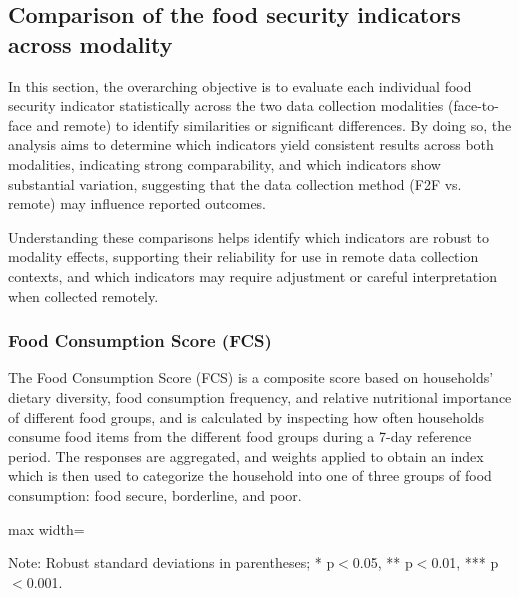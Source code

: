 \documentclass[11pt,harvard]{article}
\begin{document}
	\subsection{Comparison of the food security indicators across modality} 
	
	In this section, the overarching objective is to evaluate each individual food security indicator statistically across the two data collection modalities (face-to-face and remote) to identify similarities or significant differences. By doing so, the analysis aims to determine which indicators yield consistent results across both modalities, indicating strong comparability, and which indicators show substantial variation, suggesting that the data collection method (F2F vs. remote) may influence reported outcomes.

	Understanding these comparisons helps identify which indicators are robust to modality effects, supporting their reliability for use in remote data collection contexts, and which indicators may require adjustment or careful interpretation when collected remotely.
	
	\subsubsection{Food Consumption Score (FCS)}
	
	The Food Consumption Score (FCS) is a composite score based on households’ dietary diversity, food consumption frequency, and relative nutritional importance of different food groups, and is calculated by inspecting how often households consume food items from the different food groups during a 7-day reference period. The responses are aggregated, and weights applied to obtain an index which is then used to categorize the household into one of three groups of food consumption: food secure, borderline, and poor.
	
	\begin{table}[htbp]
		\centering
		\begin{adjustbox}{max width=\textwidth}
			\begin{threeparttable}
				\caption{Impact of Survey Modality on Food Consumption Score and Food Groups}
				\scriptsize%
				 
				\label{tab:FCS_Modality_BF}
				\begin{tablenotes}
					\item Note: Robust standard deviations in parentheses; * p$<$0.05, ** p$<$0.01, *** p$<$0.001.
				\end{tablenotes}
			\end{threeparttable}
		\end{adjustbox}
	\end{table}
	
\end{document}
